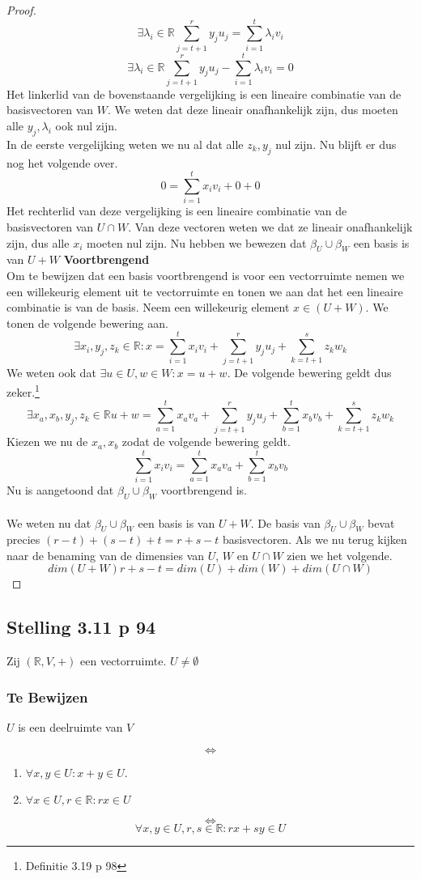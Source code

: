 \documentclass[lineaire_algebra_oplossingen.tex]{subfiles}
\begin{document}
\begin{proof}
\[
\exists \lambda_i \in \mathbb{R} \sum_{j=t+1}^ry_ju_j = \sum_{i=1}^t\lambda_iv_i
\]
\[
\exists \lambda_i \in \mathbb{R} \sum_{j=t+1}^ry_ju_j - \sum_{i=1}^t\lambda_iv_i = 0 
\]
Het linkerlid van de bovenstaande vergelijking is een lineaire combinatie van de basisvectoren van $W$. We weten dat deze lineair onafhankelijk zijn, dus moeten alle $y_j,  \lambda_i$ ook nul zijn.\\
In de eerste vergelijking weten we nu al dat alle $z_k,y_j$ nul zijn. Nu blijft er dus nog het volgende over.
\[
0 = \sum_{i=1}^tx_iv_i + 0 + 0
\]
Het rechterlid van deze vergelijking is een lineaire combinatie van de basisvectoren van $U\cap W$. Van deze vectoren weten we dat ze lineair onafhankelijk zijn, dus alle $x_i$ moeten nul zijn.
Nu hebben we bewezen dat $\beta_U\cup \beta_W$ een basis is van $U+W$
\textbf{Voortbrengend}\\
Om te bewijzen dat een basis voortbrengend is voor een vectorruimte nemen we een willekeurig element uit te vectorruimte en tonen we aan dat het een lineaire combinatie is van de basis.
Neem een willekeurig element $x \in (U + W)$. We tonen de volgende bewering aan.
\[
\exists x_i,y_j,z_k \in \mathbb{R}: x = \sum_{i=1}^tx_iv_i + \sum_{j=t+1}^ry_ju_j + \sum_{k=t+1}^sz_kw_k
\]
We weten ook dat $\exists u\in U, w\in W: x = u+w$. De volgende bewering geldt dus zeker.\footnote{Definitie 3.19 p 98}
\[
\exists x_a,x_b,y_j,z_k \in \mathbb{R}  u+w = \sum_{a=1}^tx_av_a + \sum_{j=t+1}^ry_ju_j + \sum_{b=1}^tx_bv_b + \sum_{k=t+1}^sz_kw_k
\]
Kiezen we nu de $x_a,x_b$ zodat de volgende bewering geldt.
\[
\sum_{i=1}^tx_iv_i = \sum_{a=1}^tx_av_a + \sum_{b=1}^tx_bv_b 
\]
Nu is aangetoond dat $\beta_U \cup \beta_W$ voortbrengend is.
\\\\ 
We weten nu dat $\beta_U \cup \beta_W$ een basis is van $U+W$. De basis van $\beta_U \cup \beta_W$ bevat precies $(r-t)+(s-t)+t = r+s-t$ basisvectoren. Als we nu terug kijken naar de benaming van de dimensies van $U$, $W$ en $U\cap W$ zien we het volgende.
\[
dim(U+W) r+s-t = dim(U) + dim(W) + dim(U \cap W)
\]
\end{proof}

\subsection{Stelling 3.11 p 94}
Zij $(\mathbb{R},V,+)$ een vectorruimte. $U \neq \emptyset$
\subsubsection*{Te Bewijzen}
\begin{center}
$U$ is een deelruimte van $V$
\end{center}
\[
\Leftrightarrow
\] 
\begin{enumerate}
\item $\forall x,y\in U: x+y\in U$.
\item $\forall x\in U, r\in \mathbb{R}: rx \in U$
\end{enumerate}
\[
\Leftrightarrow
\]
\[
\forall x,y\in U, r,s\in \mathbb{R}: rx+sy\in U
\]
\end{document}

